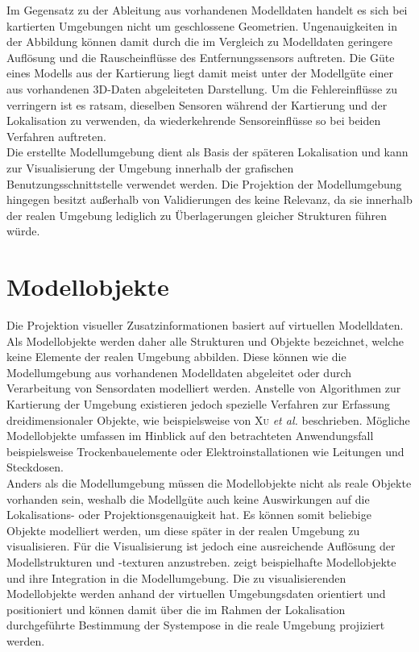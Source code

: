 
Im Gegensatz zu der Ableitung aus vorhandenen Modelldaten handelt es sich bei kartierten Umgebungen nicht um geschlossene Geometrien. Ungenauigkeiten in der Abbildung können damit durch die im Vergleich zu Modelldaten geringere Auflösung und die Rauscheinflüsse des Entfernungssensors auftreten. Die Güte eines Modells aus der Kartierung liegt damit meist unter der Modellgüte einer aus vorhandenen 3D-Daten abgeleiteten Darstellung. Um die Fehlereinflüsse zu verringern ist es ratsam, dieselben Sensoren während der Kartierung und der Lokalisation zu verwenden, da wiederkehrende Sensoreinflüsse so bei beiden Verfahren auftreten.\\

Die erstellte Modellumgebung dient als Basis der späteren Lokalisation und kann zur Visualisierung der Umgebung innerhalb der grafischen Benutzungsschnittstelle verwendet werden. Die Projektion der Modellumgebung hingegen besitzt außerhalb von Validierungen des  keine Relevanz, da sie innerhalb der realen Umgebung lediglich zu Überlagerungen gleicher Strukturen führen würde.

\section{Modellobjekte}
Die Projektion visueller Zusatzinformationen basiert auf virtuellen Modelldaten. Als Modellobjekte werden daher alle Strukturen und Objekte bezeichnet, welche keine Elemente der realen Umgebung abbilden. Diese können wie die Modellumgebung aus vorhandenen Modelldaten abgeleitet oder durch Verarbeitung von Sensordaten modelliert werden. Anstelle von Algorithmen zur Kartierung der Umgebung existieren jedoch spezielle Verfahren zur Erfassung dreidimensionaler Objekte, wie beispielsweise von \textsc{Xu} \textit{et al.} \cite{Xu2012} beschrieben. Mögliche Modellobjekte umfassen im Hinblick auf den betrachteten Anwendungsfall beispielsweise Trockenbauelemente oder Elektroinstallationen wie Leitungen und Steckdosen.\\

Anders als die Modellumgebung müssen die Modellobjekte nicht als reale Objekte vorhanden sein, weshalb die Modellgüte auch keine Auswirkungen auf die Lokalisations- oder Projektionsgenauigkeit hat. Es können somit beliebige Objekte modelliert werden, um diese später in der realen Umgebung zu visualisieren.  Für die Visualisierung ist jedoch eine ausreichende Auflösung der Modellstrukturen und -texturen anzustreben.  zeigt beispielhafte Modellobjekte und ihre Integration in die Modellumgebung. Die zu visualisierenden Modellobjekte werden anhand der virtuellen Umgebungsdaten orientiert und positioniert und können damit über die im Rahmen der Lokalisation durchgeführte Bestimmung der Systempose in die reale Umgebung projiziert werden.

